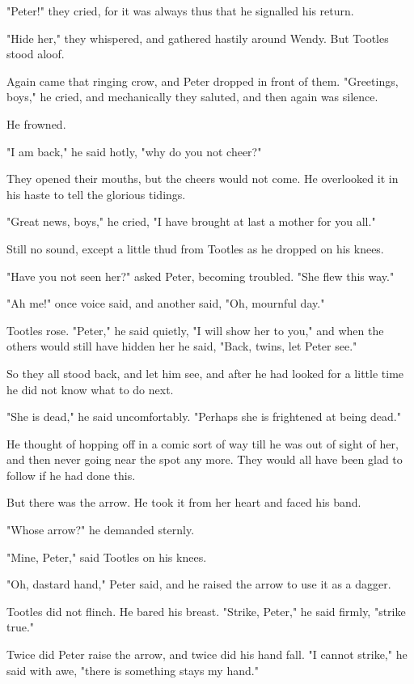 "Peter!" they cried, for it was always thus that he signalled his return.


"Hide her," they whispered, and gathered hastily around Wendy. But Tootles
stood aloof.


Again came that ringing crow, and Peter dropped in front of them.
"Greetings, boys," he cried, and mechanically they saluted, and then again
was silence.


He frowned.


"I am back," he said hotly, "why do you not cheer?"


They opened their mouths, but the cheers would not come. He overlooked it
in his haste to tell the glorious tidings.


"Great news, boys," he cried, "I have brought at last a mother for you
all."


Still no sound, except a little thud from Tootles as he dropped on his
knees.


"Have you not seen her?" asked Peter, becoming troubled. "She flew this
way."


"Ah me!" once voice said, and another said, "Oh, mournful day."


Tootles rose. "Peter," he said quietly, "I will show her to you," and when
the others would still have hidden her he said, "Back, twins, let Peter
see."


So they all stood back, and let him see, and after he had looked for a
little time he did not know what to do next.


"She is dead," he said uncomfortably. "Perhaps she is frightened at being
dead."


He thought of hopping off in a comic sort of way till he was out of sight
of her, and then never going near the spot any more. They would all have
been glad to follow if he had done this.


But there was the arrow. He took it from her heart and faced his band.


"Whose arrow?" he demanded sternly.


"Mine, Peter," said Tootles on his knees.


"Oh, dastard hand," Peter said, and he raised the arrow to use it as a
dagger.


Tootles did not flinch. He bared his breast. "Strike, Peter," he said
firmly, "strike true."


Twice did Peter raise the arrow, and twice did his hand fall. "I cannot
strike," he said with awe, "there is something stays my hand."


